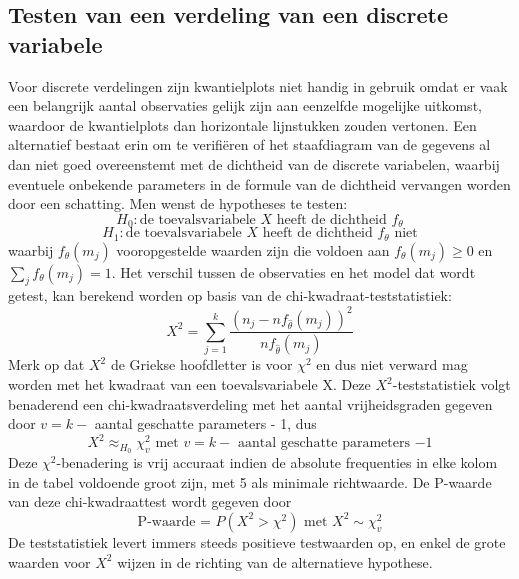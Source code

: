 \documentclass[titlepage]{article}
\numberwithin{equation}{section}
\begin{document}
\subsection{Testen van een verdeling van een discrete variabele}
Voor discrete verdelingen zijn kwantielplots niet handig in gebruik omdat er vaak een belangrijk aantal observaties gelijk zijn aan eenzelfde mogelijke uitkomst, waardoor de kwantielplots dan horizontale lijnstukken zouden vertonen. Een alternatief bestaat erin om te verifiëren of het staafdiagram van de gegevens al dan niet goed overeenstemt met de dichtheid van de discrete variabelen, waarbij eventuele onbekende parameters in de formule van de dichtheid vervangen worden door een schatting.\newline\newline
Men wenst de hypotheses te testen:
\begin{equation}
	H_0: \text{de toevalsvariabele $X$ heeft de dichtheid $f_\theta$}
	\label{6.24}
\end{equation}
\begin{equation*}
	H_1: \text{de toevalsvariabele $X$ heeft de dichtheid $f_\theta$ niet}
\end{equation*}
waarbij $f_\theta(m_j)$ vooropgestelde waarden zijn die voldoen aan $f_\theta(m_j) \geq 0$ en $\sum_jf_\theta(m_j) = 1$.\newline\newline
Het verschil tussen de observaties en het model dat wordt getest, kan berekend worden op basis van de chi-kwadraat-teststatistiek:
\begin{equation}
	X^2 = \sum\limits_{j=1}^k \frac{(n_j - nf_{\hat{\theta}}(m_j))^2}{nf_{\hat{\theta}}(m_j)}
	\label{6.25}
\end{equation}
Merk op dat $X^2$ de Griekse hoofdletter is voor $\chi^2$ en dus niet verward mag worden met het kwadraat van een toevalsvariabele X.\newline\newline
Deze $X^2$-teststatistiek volgt benaderend een chi-kwadraatsverdeling met het aantal vrijheidsgraden gegeven door $v=k-$ aantal geschatte parameters - 1, dus
\begin{equation*}
	X^2\approx_{H_0}\chi^2_v \text{ met $v=k-$ aantal geschatte parameters $-1$}
\end{equation*}
Deze $\chi^2$-benadering is vrij accuraat indien de absolute frequenties in elke kolom in de tabel voldoende groot zijn, met 5 als minimale richtwaarde. De P-waarde van deze chi-kwadraattest wordt gegeven door
\begin{equation*}
	\text{P-waarde = $P(X^2 > \chi^2)$ met $X^2 \sim \chi^2_v$}
\end{equation*}
De teststatistiek levert immers steeds positieve testwaarden op, en enkel de grote waarden voor $X^2$ wijzen in de richting van de alternatieve hypothese.
\end{document}
